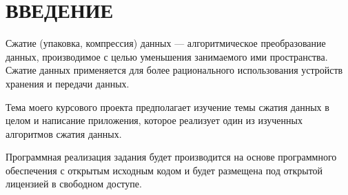 \section*{ВВЕДЕНИЕ}

Сжатие (упаковка, компрессия) данных --- алгоритмическое преобразование данных,
производимое с целью уменьшения занимаемого ими пространства.
Сжатие данных применяется для более рационального использования 
устройств хранения и передачи данных.

Тема моего курсового проекта предполагает изучение темы сжатия данных
в целом и написание приложения, которое реализует
один из изученных алгоритмов сжатия данных.

Программная реализация задания будет производится на основе программного 
обеспечения с открытым исходным кодом и будет размещена под открытой
лицензией в свободном доступе.